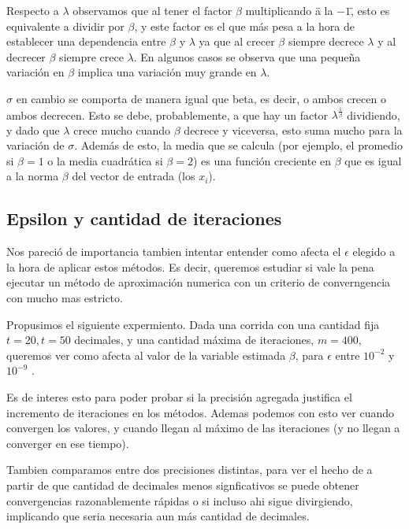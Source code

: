 Respecto a $\lambda$ observamos que al tener el factor $\beta$ multiplicando 
\"a la $-1$\", esto es equivalente a dividir por $\beta$, y este factor es el 
que m\'as pesa a la hora de establecer una dependencia entre $\beta$ y $\lambda$ 
ya que al crecer $\beta$ siempre decrece $\lambda$ y al decrecer $\beta$ siempre
crece $\lambda$. En algunos casos se observa que una peque\~na variaci\'on en 
$\beta$ implica una variaci\'on muy grande en $\lambda$.

$\sigma$ en cambio se comporta de manera igual que beta, es decir, o ambos 
crecen o ambos decrecen. Esto se debe, probablemente, a que hay un factor 
$\lambda^{\frac{1}{\beta}}$ dividiendo, y dado que $\lambda$ crece mucho cuando 
$\beta$ decrece y viceversa, esto suma mucho para la variaci\'on de $\sigma$. 
Adem\'as de esto, la media que se calcula (por ejemplo, el promedio si $\beta = 
1$ o la media cuadr\'atica si $\beta = 2$) es una funci\'on creciente en 
$\beta$ que es igual a la norma $\beta$ del vector de entrada (los $x_i$).


\subsection{Epsilon y cantidad de iteraciones}

\indent Nos pareci\'o de importancia tambien intentar entender como afecta
el $\epsilon$ elegido a la hora de aplicar estos m\'etodos. Es decir,
queremos estudiar si vale la pena ejecutar un m\'etodo de aproximaci\'on numerica
con un criterio de converngencia con mucho mas estricto.

Propusimos el siguiente expermiento. Dada una corrida con una cantidad fija $t=20, t=50$ decimales,
y una cantidad m\'axima de iteraciones, $m=400$, queremos ver como afecta al valor
de la variable estimada $\beta$, para $\epsilon$ entre $10^{-2}$ y $10^{-9}$ .

Es de interes esto para poder probar si la precisi\'on agregada justifica el incremento
de iteraciones en los m\'etodos. Ademas podemos con esto ver cuando convergen los valores, y
cuando llegan al m\'aximo de las iteraciones (y no llegan a converger en ese tiempo).

Tambien comparamos entre dos precisiones distintas, para ver el hecho de a partir de que 
cantidad de decimales menos signficativos se puede obtener convergencias razonablemente 
r\'apidas o si incluso ahi sigue divirgiendo, implicando que seria necesaria aun m\'as cantidad
de decimales.



